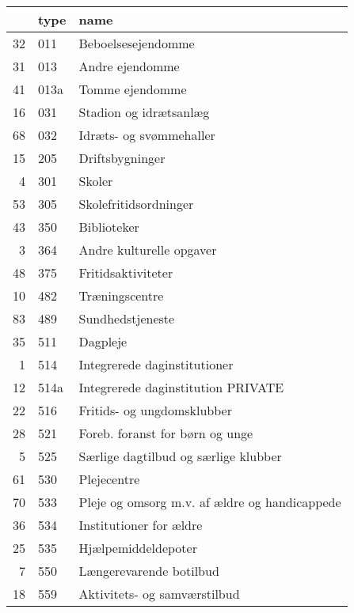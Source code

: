 \begin{table}[ht]
\centering
\begin{tabular}{rll}
  \hline
 & type & name \\ 
  \hline
32 & 011 &  Beboelsesejendomme \\ 
  31 & 013 &  Andre ejendomme \\ 
  41 & 013a &  Tomme ejendomme \\ 
  16 & 031 &  Stadion og idrætsanlæg \\ 
  68 & 032 &  Idræts- og svømmehaller \\ 
  15 & 205 &  Driftsbygninger \\ 
  4 & 301 &  Skoler \\ 
  53 & 305 &  Skolefritidsordninger \\ 
  43 & 350 &  Biblioteker \\ 
  3 & 364 &  Andre kulturelle opgaver \\ 
  48 & 375 &  Fritidsaktiviteter \\ 
  10 & 482 & Træningscentre \\ 
  83 & 489 & Sundhedstjeneste \\ 
  35 & 511 &  Dagpleje \\ 
  1 & 514 &  Integrerede daginstitutioner \\ 
  12 & 514a &  Integrerede daginstitution PRIVATE \\ 
  22 & 516 &  Fritids- og ungdomsklubber \\ 
  28 & 521 &  Foreb. foranst for børn og unge \\ 
  5 & 525 & Særlige dagtilbud og særlige klubber \\ 
  61 & 530 & Plejecentre \\ 
  70 & 533 & Pleje og omsorg m.v. af ældre og handicappede \\ 
  36 & 534 &  Institutioner for ældre \\ 
  25 & 535 & Hjælpemiddeldepoter \\ 
  7 & 550 & Længerevarende botilbud \\ 
  18 & 559 &  Aktivitets- og samværstilbud \\ 
   \hline
\end{tabular}
\end{table}
